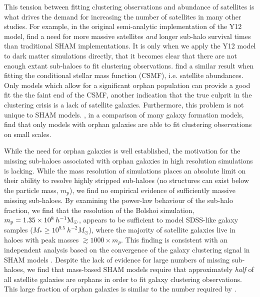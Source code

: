 \documentclass[useAMS,fleqn,usenatbib]{mnras}
\begin{document}
This tension between fitting clustering observations and abundance of satellites is what drives the demand for increasing the number of satellites in many other studies.  For example, in the original semi-analytic implementation of the Y12 model, \cite{Yang:2012ew} find a need for more massive satellites {\em and} longer sub-halo survival times than traditional SHAM implementations.  It is only when we apply the Y12 model to dark matter simulations directly, that it becomes clear that there are not enough extant sub-haloes to fit clustering observations.  \citet{Lim:2016ul} find a similar result when fitting the conditional stellar mass function (CSMF), i.e. satellite abundances.  Only models which allow for a significant orphan population can provide a good fit the the faint end of the CSMF, another indication that the true culprit in the clustering crisis is a lack of satellite galaxies.  Furthermore, this problem is not unique to SHAM models.  \cite{Pujol:2017ua}, in a comparison of many galaxy formation models, find that only models with orphan galaxies are able to fit clustering observations on small scales. 

While the need for orphan galaxies is well established, the motivation for the missing sub-haloes associated with orphan galaxies in high resolution simulations is lacking.  While the mass resolution of simulations places an absolute limit on their ability to resolve highly stripped sub-haloes (no structures can exist below the particle mass, $m_p$), we find no empirical evidence of sufficiently massive missing sub-haloes.  By examining the power-law behaviour of the sub-halo fraction, we find that the resolution of the Bolshoi simulation, $m_{\rm p} = 1.35 \times 10^8 \>h^{-1}\rm M_\odot$, appears to be sufficient to model SDSS-like galaxy samples ($M_* \geq 10^{9.5}~h^{-2}M_{\odot}$), where the majority of satellite galaxies live in haloes with peak masses $\gtrsim 1000 \times m_p$.  This finding is consistent with an independent analysis based on the convergence of the galaxy clustering signal in SHAM models \citep{Guo:2013fm}.  Despite the lack of evidence for large numbers of missing sub-haloes, we find that mass-based SHAM models require that approximately {\em half} of all satellite galaxies are orphans in order to fit galaxy clustering observations.  This large fraction of orphan galaxies is similar to the number required by \cite{Yang:2012ew}.      
\end{document}
